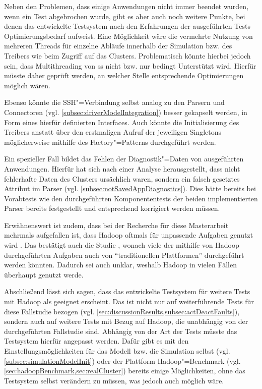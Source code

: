 Neben den Problemen, dass einige Anwendungen nicht immer beendet wurden, wenn ein Test abgebrochen wurde, gibt es aber auch noch weitere Punkte, bei denen das entwickelte Testsystem nach den Erfahrungen der ausgeführten Tests Optimierungsbedarf aufweist.
Eine Möglichkeit wäre \zB die vermehrte Nutzung von mehreren Threads für einzelne Abläufe innerhalb der Simulation bzw. des Treibers wie beim Zugriff auf das Clusters.
Problematisch könnte hierbei jedoch sein, dass Multithreading von \gls{ss} nicht bzw. nur bedingt Unterstützt wird.
Hierfür müsste daher geprüft werden, an welcher Stelle entsprechende Optimierungen möglich wären.

Ebenso könnte die SSH"=Verbindung selbst analog zu den Parsern und Connectoren (vgl. \cref{subsec:driverModelIntegration}) besser gekapselt werden, \zB in Form eines hierfür definierten Interfaces.
Auch könnte die Initialisierung des Treibers anstatt über den erstmaligen Aufruf der jeweiligen Singletons möglicherweise mithilfe des Factory"=Patterns durchgeführt werden.

Ein spezieller Fall bildet das Fehlen der Diagnostik"=Daten von ausgeführten Anwendungen.
Hierfür hat sich nach einer Analyse herausgestellt, dass nicht fehlerhafte Daten des Clusters ursächlich waren, sondern ein falsch gesetztes Attribut im Parser (vgl. \cref{subsec:notSavedAppDiagnostics}).
Dies hätte bereits bei Vorabtests wie den durchgeführten Komponententests der beiden implementierten Parser bereits festgestellt und entsprechend korrigiert werden müssen.

Erwähnenswert ist zudem, dass bei der Recherche für diese Masterarbeit mehrmals aufgefallen ist, dass Hadoop oftmals für unpassende Aufgaben genutzt wird \cite{Ren2013,Vavilapalli2013}.
Das bestätigt auch die Studie \cite{HadoopDataTypes}, wonach viele der mithilfe von Hadoop durchgeführten Aufgaben auch von \enquote{traditionellen Plattformen} durchgeführt werden könnten.
Dadurch sei auch unklar, weshalb Hadoop in vielen Fällen überhaupt genutzt werde.

Abschließend lässt sich sagen, dass das entwickelte Testsystem für weitere Tests mit Hadoop als geeignet erscheint.
Das ist nicht nur auf weiterführende Tests für diese Fallstudie bezogen (vgl. \cref{sec:discussionResults,subsec:actDeactFaults}), sondern auch auf weitere Tests mit Bezug auf Hadoop, die unabhängig von der durchgeführten Fallstudie sind.
Abhängig von der Art der Tests müsste das Testsystem  hierfür angepasst werden.
Dafür gibt es mit den Einstellungsmöglichkeiten für das Modell bzw. die Simulation selbst (vgl. \cref{subsec:simulationModelInit}) oder der Plattform Hadoop"=Benchmark (vgl. \cref{sec:hadoopBenchmark,sec:realCluster}) bereits einige Möglichkeiten, ohne das Testsystem selbst verändern zu müssen, was jedoch auch möglich wäre.
